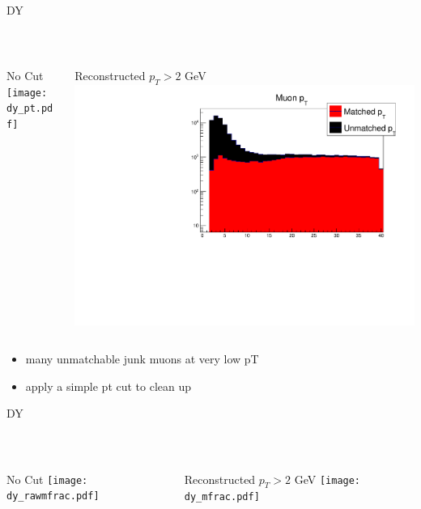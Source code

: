 \documentclass[10pt,handout]{beamer}
\begin{document}
\begin{frame}{ DY } 

\quad \quad \\
\begin{columns}
\begin{column}{0.5\textwidth}
No Cut
\texttt{[image: dy\_pt.pdf]}

\end{column}
\begin{column}{0.5\textwidth}
Reconstructed $p_T > 2 $ GeV
\includegraphics[scale=.3]{dy_ptcut.pdf}
\end{column}
\end{columns}

\begin{itemize}
\item many unmatchable junk muons at very low pT
\item apply a simple pt cut to clean up 
\end{itemize}
\end{frame}

\begin{frame}{ DY } 

\quad \quad \\
\begin{columns}
\begin{column}{0.5\textwidth}
No Cut
\texttt{[image: dy\_rawmfrac.pdf]}

\end{column}
\begin{column}{0.5\textwidth}
Reconstructed $p_T > 2 $ GeV
\texttt{[image: dy\_mfrac.pdf]}
\end{column}
\end{columns}


\end{frame}
\end{document}
